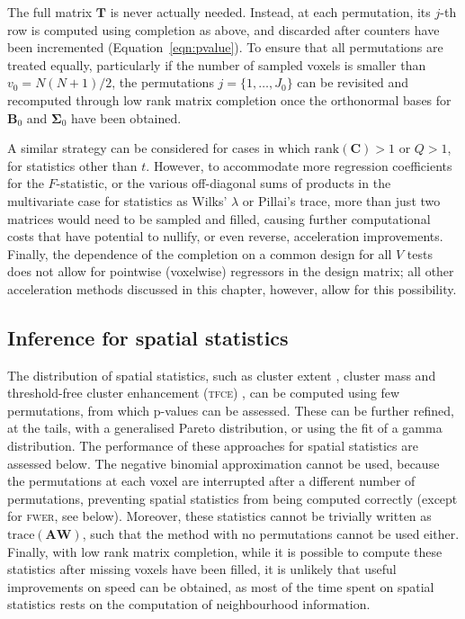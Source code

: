 The full matrix $\mathbf{T}$ is never actually needed. Instead, at each permutation, its $j$-th row is computed using completion as above, and discarded after counters have been incremented (Equation~\ref{eqn:pvalue}). To ensure that all permutations are treated equally, particularly if the number of sampled voxels is smaller than  $v_0 = N(N+1)/2$, the permutations $j=\{1,\ldots,J_0\}$ can be revisited and recomputed through low rank matrix completion once the orthonormal bases for $\mathbf{B}_0$ and $\boldsymbol{\Sigma}_0$ have been obtained.

A similar strategy can be considered for cases in which $\text{rank}(\mathbf{C}) > 1$ or $Q>1$, for statistics other than $t$. However, to accommodate more regression coefficients for the $F$-statistic, or the various off-diagonal sums of products in the multivariate case for statistics as Wilks' $\lambda$ or Pillai's trace, more than just two matrices would need to be sampled and filled, causing further computational costs that have potential to nullify, or even reverse, acceleration improvements. Finally, the dependence of the completion on a common design for all $V$ tests does not allow for pointwise (voxelwise) regressors in the design matrix; all other acceleration methods discussed in this chapter, however, allow for this possibility.

\subsection{Inference for spatial statistics}
\label{sec:accel:spatial}

The distribution of spatial statistics, such as cluster extent \citep{Friston1994}, cluster mass \citep{Poline1997, Bullmore1999} and threshold-free cluster enhancement (\textsc{tfce}) \citep{Smith2009}, can be computed using few permutations, from which p-values can be assessed. These can be further refined, at the tails, with a generalised Pareto distribution, or using the fit of a gamma distribution. The performance of these approaches for spatial statistics are assessed below. The negative binomial approximation cannot be used, because the permutations at each voxel are interrupted after a different number of permutations, preventing spatial statistics from being computed correctly (except for \textsc{fwer}, see below). Moreover, these statistics cannot be trivially written as $\text{trace}(\mathbf{A}\mathbf{W})$, such that the method with no permutations cannot be used either. Finally, with low rank matrix completion, while it is possible to compute these statistics after missing voxels have been filled, it is unlikely that useful improvements on speed can be obtained, as most of the time spent on spatial statistics rests on the computation of neighbourhood information.

